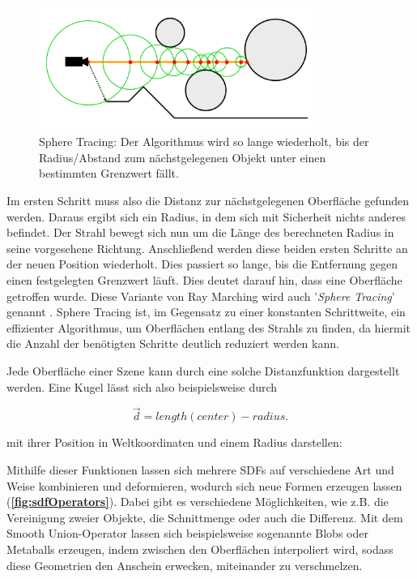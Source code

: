 \begin{figure}[!h]
	\centering
	\includegraphics[width=0.80\textwidth]{Grafiken/Basics/Volume/Sphere_Tracing.png}
	\begin{footnotesize}
		\caption{Sphere Tracing: Der Algorithmus wird so lange wiederholt, bis der Radius/Abstand zum nächstgelegenen
			Objekt unter einen bestimmten Grenzwert fällt.}
	\end{footnotesize}
\end{figure}


Im ersten Schritt muss also die Distanz zur nächstgelegenen Oberfläche gefunden werden. Daraus ergibt sich ein Radius, in dem sich
mit Sicherheit nichts anderes befindet. Der Strahl bewegt sich nun um die Länge des berechneten Radius in seine vorgesehene Richtung.
Anschließend werden diese beiden ersten Schritte an der neuen Position wiederholt. Dies passiert so lange, bis die Entfernung gegen einen festgelegten
Grenzwert läuft. Dies deutet darauf hin, dass eine Oberfläche getroffen wurde. Diese Variante von Ray Marching wird auch
'\textit{Sphere Tracing}' genannt \parencite{Hart96}. Sphere Tracing ist, im Gegensatz zu einer konstanten Schrittweite, ein effizienter Algorithmus,
um Oberflächen entlang des Strahls zu finden, da hiermit die Anzahl der benötigten Schritte deutlich reduziert werden kann.

Jede Oberfläche einer Szene kann durch eine solche Distanzfunktion dargestellt werden.
Eine Kugel lässt sich also beispielsweise durch 

\vspace{-0.3cm  }
\begin{equation}
	\vec{d} = length(center) - radius.
\end{equation}

mit ihrer Position in Weltkoordinaten und einem Radius darstellen:



Mithilfe dieser Funktionen lassen sich mehrere SDFs auf verschiedene Art und Weise kombinieren und deformieren, wodurch sich neue Formen
erzeugen lassen (\textbf{\autoref{fig:sdfOperators}}).
Dabei gibt es verschiedene Möglichkeiten, wie z.B. die Vereinigung zweier Objekte, die Schnittmenge oder auch die Differenz.
Mit dem Smooth Union-Operator lassen sich beispielsweise sogenannte Blobs oder Metaballs erzeugen, indem zwischen
den Oberflächen interpoliert wird, sodass diese Geometrien den Anschein erwecken, miteinander zu verschmelzen.

